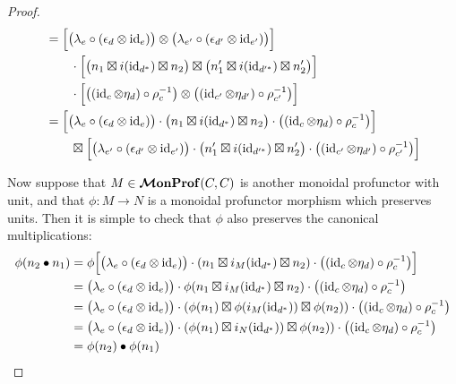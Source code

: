 \documentclass[12pt,oneside,article,draft]{memoir}
\begin{document}
\begin{proof}
\begin{align*}
      &= \Bigl[\bigl(\lambda_e\circ(\epsilon_d\otimes\operatorname{id}_e)\bigr)\otimes\bigl(\lambda_{e'}\circ(\epsilon_{d'}\otimes\operatorname{id}_{e'})\bigr)\Bigr] \\
      &\qquad \cdot\Bigl[\bigl(n_1\boxtimes i(\operatorname{id}_{d^*})\boxtimes n_2\bigr)\boxtimes\bigl(n'_1\boxtimes i(\operatorname{id}_{d'^*})\boxtimes n'_2\bigr)\Bigr] \\
      &\qquad \cdot\Bigl[\bigl((\operatorname{id}_c\otimes\eta_d)\circ\rho_c^{-1}\bigr)\otimes\bigl((\operatorname{id}_{c'}\otimes\eta_{d'})\circ\rho_{c'}^{-1}\bigr)\Bigr] \\
      &= \Bigl[\bigl(\lambda_e\circ(\epsilon_d\otimes\operatorname{id}_e)\bigr)\cdot\bigl(n_1\boxtimes i(\operatorname{id}_{d^*})\boxtimes n_2\bigr)\cdot\bigl((\operatorname{id}_c\otimes\eta_d)\circ\rho_c^{-1}\bigr)\Bigr] \\
      &\qquad \boxtimes\Bigl[\bigl(\lambda_{e'}\circ(\epsilon_{d'}\otimes\operatorname{id}_{e'})\bigr)\cdot\bigl(n'_1\boxtimes i(\operatorname{id}_{d'^*})\boxtimes n'_2\bigr)\cdot\bigl((\operatorname{id}_{c'}\otimes\eta_{d'})\circ\rho_{c'}^{-1}\bigr)\Bigr]
   \end{align*}

   Now suppose that $M\in\bm{\mathcal{M}}\mathbf{onProf}(C, C)$ is another monoidal profunctor with unit, and that $\phi\colon M\to N$ is a monoidal profunctor morphism which preserves units.
   Then it is simple to check that $\phi$ also preserves the canonical multiplications:
   \begin{align*}
      \phi(n_2\bullet n_1) &= \phi\Bigl[\bigl(\lambda_e\circ(\epsilon_d\otimes\operatorname{id}_e)\bigr)\cdot(n_1\boxtimes i_M(\operatorname{id}_{d^*})\boxtimes n_2)\cdot\bigl((\operatorname{id}_c\otimes \eta_d)\circ\rho_c^{-1}\bigr)\Bigr] \\
      &= \bigl(\lambda_e\circ(\epsilon_d\otimes\operatorname{id}_e)\bigr)\cdot\phi(n_1\boxtimes i_M(\operatorname{id}_{d^*})\boxtimes n_2)\cdot\bigl((\operatorname{id}_c\otimes \eta_d)\circ\rho_c^{-1}\bigr) \\
      &= \bigl(\lambda_e\circ(\epsilon_d\otimes\operatorname{id}_e)\bigr)\cdot(\phi(n_1)\boxtimes \phi(i_M(\operatorname{id}_{d^*}))\boxtimes \phi(n_2))\cdot\bigl((\operatorname{id}_c\otimes \eta_d)\circ\rho_c^{-1}\bigr) \\
      &= \bigl(\lambda_e\circ(\epsilon_d\otimes\operatorname{id}_e)\bigr)\cdot(\phi(n_1)\boxtimes i_N(\operatorname{id}_{d^*}))\boxtimes \phi(n_2))\cdot\bigl((\operatorname{id}_c\otimes \eta_d)\circ\rho_c^{-1}\bigr) \\
      &= \phi(n_2)\bullet\phi(n_1)
   \end{align*}
\end{proof}
\end{document}
